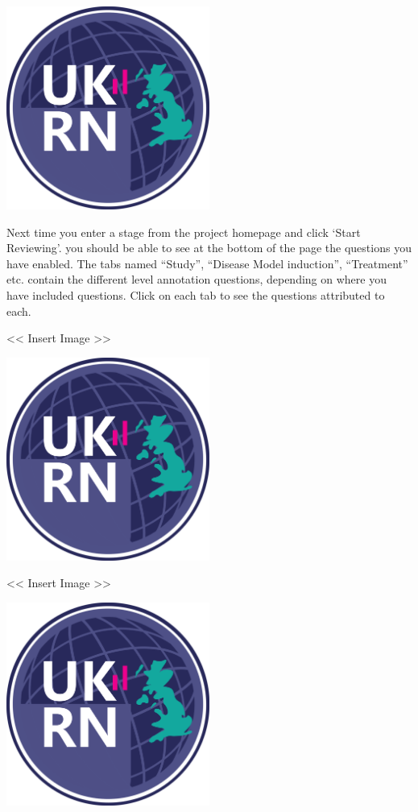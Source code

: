\documentclass[]{book}
\begin{document}
\includegraphics[width=0.50000\textwidth,height=0.50000\textwidth]{figs/evidence-triangle.png}

Next time you enter a stage from the project homepage and click `Start
Reviewing'. you should be able to see at the bottom of the page the
questions you have enabled. The tabs named ``Study'', ``Disease Model
induction'', ``Treatment'' etc. contain the different level annotation
questions, depending on where you have included questions. Click on each
tab to see the questions attributed to each.

\textless{}\textless{} Insert Image \textgreater{}\textgreater{}

\includegraphics[width=0.50000\textwidth,height=0.50000\textwidth]{figs/evidence-triangle.png}

\textless{}\textless{} Insert Image \textgreater{}\textgreater{}

\includegraphics[width=0.50000\textwidth,height=0.50000\textwidth]{figs/evidence-triangle.png}
\end{document}
